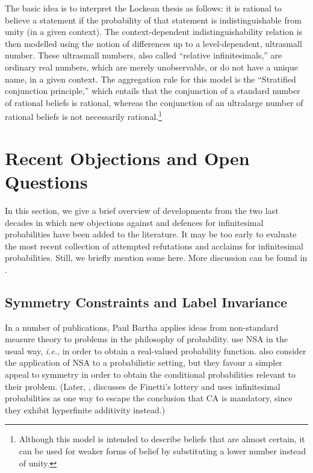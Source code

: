 The basic idea is to interpret the Lockean thesis as follows: it is rational to believe a statement if the probability of that statement is indistinguishable from unity (in a given context). The context-dependent indistinguishability relation is then modelled using the notion of differences up to a level-dependent, ultrasmall number. These ultrasmall numbers, also called ``relative infinitesimals,'' are ordinary real numbers, which are merely unobservable, or do not have a unique name, in a given context. The aggregation rule for this model is the ``Stratified conjunction principle,'' which entails that the conjunction of a standard number of rational beliefs is rational, whereas the conjunction of an ultralarge number of rational beliefs is not necessarily rational.\footnote{Although this model is intended to describe beliefs that are almost certain, it can be used for weaker forms of belief by substituting a lower number instead of unity.}

\section{Recent Objections and Open Questions}\label{sec:objections}
In this section, we give a brief overview of developments from the two last decades in which new objections against and defences for infinitesimal probabilities have been added to the literature. It may be too early to evaluate the most recent collection of attempted refutations and acclaims for infinitesimal probabilities. Still, we briefly mention some here. More discussion can be found in \citet{Benci_etal:2018}.

\subsection{Symmetry Constraints and Label Invariance}\label{sec:symm}
In a number of publications, Paul Bartha applies ideas from non-standard measure theory to problems in the philosophy of probability.
\citet{BarthaHitchcock:1999} use NSA in the usual way, \textit{i.e.}, in order to obtain a real-valued probability function.
\citet{BarthaJohns:2001} also consider the application of NSA to a probabilistic setting, but they favour a simpler appeal to symmetry in order to obtain the conditional probabilities relevant to their problem.
(Later, \citealp{Bartha:2004}, discusses de Finetti's lottery and uses infinitesimal probabilities as one way to escape the conclusion that CA is mandatory, since they exhibit hyperfinite additivity instead.)

